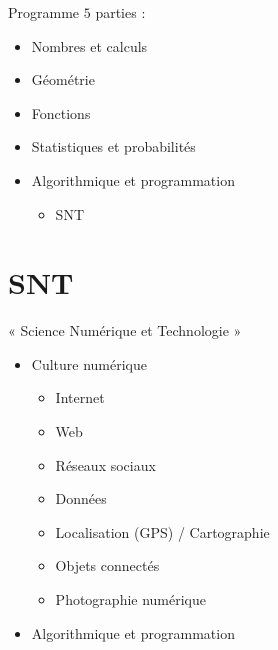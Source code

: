 \documentclass[17pt,xcolor=x11names]{beamer}
\begin{document}
\begin{frame}{Programme}
$5$ parties :
  \begin{itemize}
    \item Nombres et calculs
    \item Géométrie
    \item Fonctions
    \item Statistiques et probabilités
    \item Algorithmique et programmation
      \begin{itemize}
        \item SNT
      \end{itemize}
  \end{itemize}
\end{frame}

\section{SNT}
\begin{frame}
« Science Numérique et Technologie »
  \begin{itemize}
    \item Culture numérique
      \begin{itemize}
        \item Internet
        \item Web
        \item Réseaux sociaux
        \item Données
        \item Localisation (GPS) / Cartographie
        \item Objets connectés
        \item Photographie numérique
      \end{itemize}
    \item Algorithmique et programmation
  \end{itemize}
\end{frame}
\end{document}
